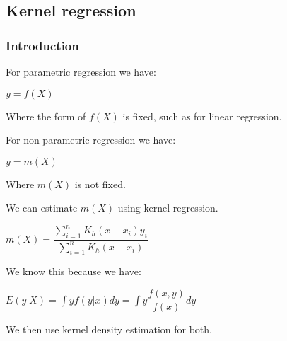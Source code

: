 
\subsection{Kernel regression}

\subsubsection{Introduction}

For parametric regression we have:

\(y=f(X)\)

Where the form of \(f(X)\) is fixed, such as for linear regression.

For non-parametric regression we have:

\(y=m(X)\)

Where \(m(X)\) is not fixed.

We can estimate \(m(X)\) using kernel regression.

\(m(X)=\dfrac{\sum_{i=1}^nK_h(x-x_i)y_i}{\sum_{i=1}^nK_h(x-x_i)}\)

We know this because we have:

\(E(y|X)=\int yf(y|x)dy=\int y\dfrac{f(x,y)}{f(x)}dy\)

We then use kernel density estimation for both.

